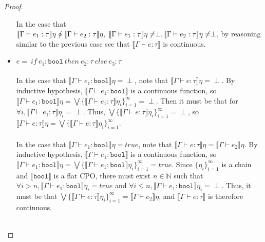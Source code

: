 \documentclass{westhesis}
\theoremstyle{plain}
\theoremstyle{definition}
\begin{document}
\begin{proof}
\begin{itemize}
 In the case that $\llbracket \Gamma \vdash e_1 : \tau \rrbracket\eta \ \slashed{\circ} \ \llbracket \Gamma \vdash e_2 : \tau\rrbracket\eta, \ \llbracket \Gamma \vdash e_1 : \tau \rrbracket\eta \neq \perp, \\ \llbracket \Gamma \vdash e_2 : \tau \rrbracket\eta \neq \perp$, by reasoning similar to the previous case see that $\llbracket \Gamma \vdash e : \tau \rrbracket$ is continuous.
 \item $e = \ if \ e_1 : \texttt{bool} \ then \ e_2 : \tau \ else \ e_3 : \tau$ \\ \\
In the case that $\llbracket \Gamma \vdash e_1 : \texttt{bool} \rrbracket\eta = \perp$, note that $\llbracket \Gamma \vdash e : 
\tau \rrbracket\eta =  \perp$. By inductive hypothesis, $\llbracket \Gamma \vdash e_1 : \texttt{bool} \rrbracket$ is a 
continuous function, so $\llbracket \Gamma \vdash e_1 : \texttt{bool} \rrbracket\eta = \bigvee\{\llbracket \Gamma \vdash e_1 : 
\tau \rrbracket\eta_i\}^{\infty}_{i=1} = \perp$. Then it must be that for $\forall i, \llbracket \Gamma \vdash e_1 : \tau 
\rrbracket\eta_i = \perp$. Thus, $\bigvee\{\llbracket \Gamma \vdash e : \tau \rrbracket\eta_i\}^{\infty}_{i=1} = \perp$, so $
\llbracket \Gamma \vdash e : \tau \rrbracket\eta = \bigvee\{\llbracket \Gamma \vdash e : \tau \rrbracket\eta_i\}^{\infty}_{i=1}$. \\ \\
In the case that $\llbracket \Gamma \vdash e_1 : \texttt{bool} \rrbracket\eta = true$, note that $\llbracket \Gamma \vdash e : 
\tau \rrbracket\eta =  \llbracket \Gamma \vdash e_2 \rrbracket\eta$. By inductive hypothesis, $\llbracket \Gamma \vdash e_1 : 
\texttt{bool} \rrbracket$ is a continuous function, so $\llbracket \Gamma \vdash e_1 : \texttt{bool} \rrbracket\eta = \bigvee
\{\llbracket \Gamma \vdash e_1 : \texttt{bool} \rrbracket\eta_i\}^{\infty}_{i=1} = true$. Since $\{ \eta_i\}^{\infty}_{i=1}$ is a chain 
and $\llbracket\texttt{bool}\rrbracket$ is a flat CPO, there must exist $n \in \mathbb{N}$ such that $\forall i > n, \llbracket \Gamma \vdash e_1 : 
\texttt{bool}
\rrbracket\eta_i = true$ and $\forall i \leq n, \llbracket \Gamma \vdash e_1 : \texttt{bool}\rrbracket\eta_i = \perp$. Thus, it must 
be that $\bigvee\{\llbracket \Gamma \vdash e : \tau \rrbracket\eta_i\}^{\infty}_{i=1} = \llbracket \Gamma \vdash e_2 
\rrbracket\eta$, and $\llbracket \Gamma \vdash e : \tau \rrbracket$ is therefore continuous. \\ \\

\end{itemize}
\end{proof}
\end{document}
